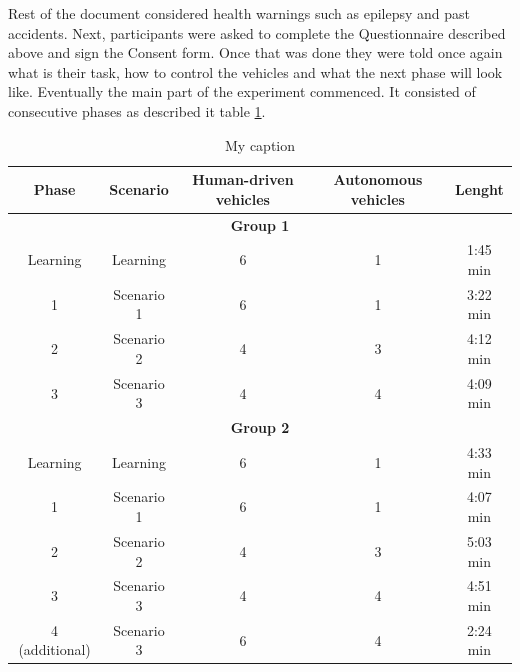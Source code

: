 \documentclass[11pt,english]{article}
\begin{document}
Rest of the document considered health warnings such as epilepsy and past accidents. Next, participants were asked to complete the Questionnaire described above and sign the Consent form. Once that was done they were told once again what is their task, how to control the vehicles and what the next phase will look like. Eventually the main part of the experiment commenced. It consisted of consecutive phases as described it table \ref{table:minutes_table}.


\begin{table}[h]
\centering
\begin{tabular}{|c|c|c|c|c|}
\hline
\textbf{Phase} & \textbf{Scenario} & \textbf{Human-driven vehicles} & \textbf{Autonomous vehicles} & \textbf{Lenght} \\ \hline
\multicolumn{5}{|c|}{\textbf{Group 1}}                                                                               \\ \hline
Learning       & Learning          & 6                              & 1                            & 1:45 min        \\ \hline
1              & Scenario 1        & 6                              & 1                            & 3:22 min        \\ \hline
2              & Scenario 2        & 4                              & 3                            & 4:12 min        \\ \hline
3              & Scenario 3        & 4                              & 4                            & 4:09 min        \\ \hline
\multicolumn{5}{|c|}{\textbf{Group 2}}                                                                               \\ \hline
Learning       & Learning          & 6                              & 1                            & 4:33 min        \\ \hline
1              & Scenario 1        & 6                              & 1                            & 4:07 min        \\ \hline
2              & Scenario 2        & 4                              & 3                            & 5:03 min        \\ \hline
3              & Scenario 3        & 4                              & 4                            & 4:51 min        \\ \hline
4 (additional) & Scenario 3        & 6                              & 4                            & 2:24 min        \\ \hline
\end{tabular}
\caption{My caption}
\label{table:minutes_table}
\end{table}
\end{document}
